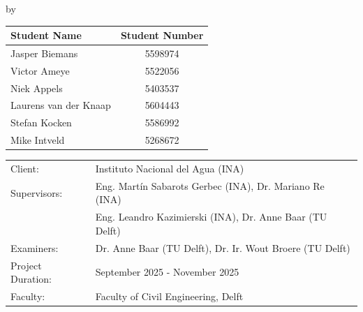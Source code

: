 \begin{titlepage}

\begin{center}

{\makeatletter
\largetitlestyle\fontsize{45}{45}\selectfont\@title
\makeatother}

{\makeatletter
\ifdefvoid{\@subtitle}{}{\bigskip\titlestyle\fontsize{20}{20}\selectfont\@subtitle}
\makeatother}

\bigskip
\bigskip

by

\bigskip
\bigskip

{\makeatletter
\largetitlestyle\fontsize{25}{25}\selectfont\@author
\makeatother}

\bigskip
\bigskip

\setlength\extrarowheight{2pt}
\begin{tabular}{lc}
    Student Name & Student Number \\\midrule
    Jasper Biemans & 5598974 \\
    Victor Ameye & 5522056 \\
    Niek Appels & 5403537 \\
    Laurens van der Knaap & 5604443 \\
    Stefan Kocken & 5586992 \\
    Mike Intveld & 5268672    
\end{tabular}

\vfill

\begin{tabular}{ll}
    Client: & Instituto Nacional del Agua (INA) \\
    Supervisors: & Eng. Martín Sabarots Gerbec (INA), Dr. Mariano Re (INA) \\ 
                 & Eng. Leandro Kazimierski (INA), Dr. Anne Baar (TU Delft) \\
    Examiners: & Dr. Anne Baar (TU Delft), Dr. Ir. Wout Broere (TU Delft) \\
    Project Duration: & September 2025 - November 2025 \\
    Faculty: & Faculty of Civil Engineering, Delft
\end{tabular}

\bigskip
\bigskip



\end{center}
\end{titlepage}
